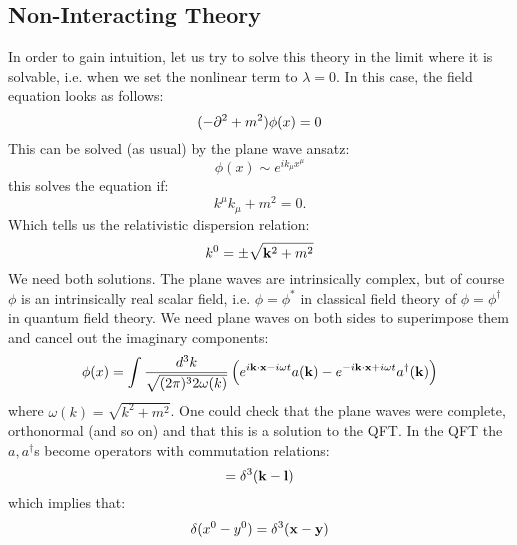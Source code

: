 \subsection{Non-Interacting Theory}
In order to gain intuition, let us try to solve this theory in the limit where it is solvable, i.e. when we set the nonlinear term to $\lambda = 0$. In this case, the field equation looks as follows:
\begin{equation}
    (-\p^2 + m^2)\phi(x) = 0
\end{equation}
This can be solved (as usual) by the plane wave ansatz:
\begin{equation}
    \phi(x) \sim e^{ik_\mu x^\mu}
\end{equation}
this solves the equation if:
\begin{equation}
    k^\mu k_\mu + m^2 = 0.
\end{equation}
Which tells us the relativistic dispersion relation:
\begin{equation}
    k^0 = \pm \sqrt{\mathbf{k}^2 + m^2}
\end{equation}
We need both solutions. The plane waves are intrinsically complex, but of course $\phi$ is an intrinsically real scalar field, i.e. $\phi = \phi^*$ in classical field theory of $\phi = \phi^\dag$ in quantum field theory. We need plane waves on both sides to superimpose them and cancel out the imaginary components:
\begin{equation}
    \phi(x) = \int \frac{d^3k}{\sqrt{(2\pi)^3 2\omega(k)}}\left(e^{i\v{k}\cdot \v{x} - i\omega t}a(\v{k}) - e^{-i\v{k}\cdot\v{x} + i\omega t}a^\dag(\v{k})\right)
\end{equation}
where $\omega(k) = \sqrt{k^2 + m^2}$. One could check that the plane waves were complete, orthonormal (and so on) and that this is a solution to the QFT. In the QFT the $a, a^\dag$s become operators with commutation relations:
\begin{equation}
    [a(\v{k}), a^\dag(\v{l})] = \delta^3(\v{k} - \v{l})
\end{equation}
which implies that:
\begin{equation}
    [\phi(x), \dpd{}{y^0}\phi(y)]\delta(x^0 -y^0) = \delta^3(\v{x} - \v{y})
\end{equation}

